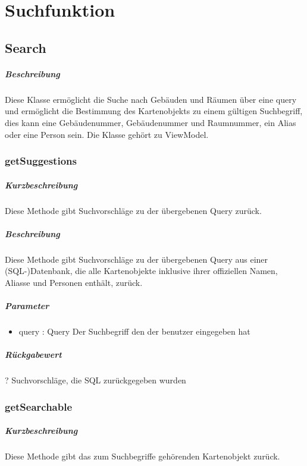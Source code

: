 \chapter{Suchfunktion}

\section{Search}
\paragraph*{Beschreibung}
Diese Klasse ermöglicht die Suche nach Gebäuden und Räumen über eine query 
und ermöglicht die Bestimmung des Kartenobjekts zu einem gültigen Suchbegriff, 
dies kann eine Gebäudenummer, Gebäudenummer und Raumnummer, ein Alias oder eine Person sein.
Die Klasse gehört zu ViewModel.

\subsection{getSuggestions}%
\paragraph*{Kurzbeschreibung}
Diese Methode gibt Suchvorschläge zu der übergebenen Query zurück.
\paragraph*{Beschreibung}
Diese Methode gibt Suchvorschläge zu der übergebenen Query aus einer (SQL-)Datenbank, die alle Kartenobjekte inklusive ihrer offiziellen Namen, Aliasse und Personen enthält, zurück.
\paragraph*{Parameter}
\begin{itemize}
    \item query : Query Der Suchbegriff den der benutzer eingegeben hat
\end{itemize}
\paragraph*{Rückgabewert}
? Suchvorschläge, die SQL zurückgegeben wurden

\subsection{getSearchable}%
\paragraph*{Kurzbeschreibung}
Diese Methode gibt das zum Suchbegriffe gehörenden Kartenobjekt zurück.
